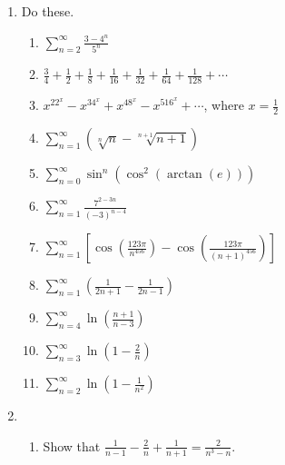\documentclass[11pt]{article}
\begin{document}
\begin{enumerate}

  \item Do these.

  \begin{enumerate}

    \item $\displaystyle \sum_{n=2}^\infty \frac{3-4^n}{5^n}$

    \item $\displaystyle \frac34 + \frac12 + \frac18 + \frac1{16} + \frac1{32} +
      \frac1{64} + \frac1{128} + \cdots$

    \item $x^22^x - x^34^x + x^48^x - x^516^x + \cdots$, where $x =
      \displaystyle \frac12$

    \item $\displaystyle \sum_{n=1}^\infty \left( \sqrt[n]n - \sqrt[n+1]{n+1}
      \right)$

    \item $\displaystyle \sum_{n=0}^\infty \sin^n(\cos^2(\arctan(e)))$

    \item $\displaystyle \sum_{n=1}^\infty \frac{7^{2-3n}}{(-3)^{n-4}}$

    \item $\displaystyle \sum_{n=1}^\infty \left[
    \cos\left(\frac{123\pi}{n^{456}}\right)
    -
    \cos\left(\frac{123\pi}{(n+1)^{456}}\right)
    \right]$

    \item $\displaystyle \sum_{n=1}^\infty \left( \frac1{2n+1} - \frac1{2n-1} \right)$

    \item $\displaystyle \sum_{n=4}^\infty \ln \left( \frac{n+1}{n-3} \right)$

    \item $\displaystyle \sum_{n=3}^\infty \ln \left( 1 - \frac2n  \right)$

    \item $\displaystyle \sum_{n=2}^\infty \ln \left( 1 - \frac1{n^2} \right)$

  \end{enumerate}

  \item \begin{enumerate}
    
    \item Show that $\displaystyle \frac1{n-1} - \frac2n + \frac1{n+1} =
      \frac2{n^3-n}$.


\end{enumerate}
\end{enumerate}
\end{document}

